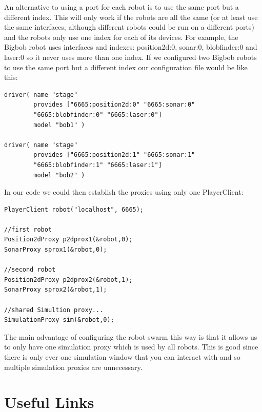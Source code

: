 \documentclass[a4paper]{report}
\begin{document}
An alternative to using a port for each robot is to use the same port but a different index. This will only work if the robots are all the same (or at least use the same interfaces, although different robots could be run on a different ports) and the robots only use one index for each of its devices. For example, the Bigbob robot uses interfaces and indexes: position2d:0, sonar:0, blobfinder:0 and laser:0 so it never uses more than one index. If we configured two Bigbob robots to use the same port but a different index our configuration file would be like this:
\begin{verbatim}
driver( name "stage" 
        provides ["6665:position2d:0" "6665:sonar:0" 
        "6665:blobfinder:0" "6665:laser:0"] 
        model "bob1" )

driver( name "stage" 
        provides ["6665:position2d:1" "6665:sonar:1" 
        "6665:blobfinder:1" "6665:laser:1"] 
        model "bob2" )
\end{verbatim}
In our code we could then establish the proxies using only one PlayerClient:
\begin{verbatim}
PlayerClient robot("localhost", 6665);

//first robot
Position2dProxy p2dprox1(&robot,0);
SonarProxy sprox1(&robot,0);

//second robot
Position2dProxy p2dprox2(&robot,1);
SonarProxy sprox2(&robot,1);

//shared Simultion proxy...
SimulationProxy sim(&robot,0);
\end{verbatim}
The main advantage of configuring the robot swarm this way is that it allows us to only have one simulation proxy which is used by all robots. This is good since there is only ever one simulation window that you can interact with and so multiple simulation proxies are unnecessary.

\chapter{Useful Links}
\end{document}
